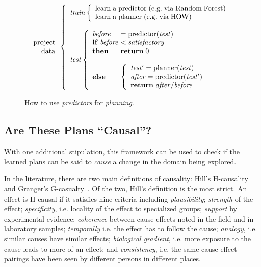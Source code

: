 \documentclass[conference]{IEEEtran}
\begin{document}
\begin{figure}[!t]
\small 
\[
\begin{array}{r}
\mathrm{project}\\
\mathrm{data}
\end{array} 
\left\{\begin{array}{l}\mathit{train}
        \left\{\begin{array}{l}
                \mathrm{learn\;a\;}\mathrm{predictor\;}\mathrm{(e.g.\;via \;Random\;Forest)}\\
                \mathrm{learn\;a\;}\mathrm{planner\;}\mathrm{(e.g.\;via \; HOW)}
              \end{array}\right.
       \\
      ~\\
\mathit{test}  
    \left\{\begin{array}{l@{~}l}
           \mathit{before}& =\mathrm{predictor}(\mathit{test})\\
           \mathrm{\bf if\;}\mathit{before} & <  \mathit{satisfactory}\\
           \mathrm{\bf then}  & \mathrm{{\bf return}\; 0}\\~\\
           \mathrm{\bf else} &
           \left\{
            \begin{array}{l}
                \mathit{test'} = \mathrm{planner}(\mathit{test})\\
                \mathit{after} =\mathrm{predictor}(\mathit{test'})\\ 
                \mathrm{{\bf return}\;} \mathit{after} /  \mathit{before}
            \end{array}
          \right.
   \end{array}\right.
\end{array} \right. 
\]
 
\caption{How to use {\em predictors} for {\em planning}.}\label{fig:work}
\end{figure}

\subsection{Are These Plans ``Causal''?}
With one additional stipulation,   this framework can be used to check if the learned
plans can be said to {\em cause} a change in the domain being explored.

In the literature, there are two main definitions of causality: Hill's H-causality~\cite{Hill1965}
and Granger's G-casualty~\cite{granger80}. 
Of the two, Hill's definition is the most strict. An effect
is H-causal if it satisfies nine criteria including
{\em  plausibility};
{\em strength} of the effect;
{\em 
specificity}, i.e. locality of the effect
to specialized groups;
{\em
support} by experimental evidence;
{\em 
coherence} between cause-effects noted
in the field and in laboratory samples;
{\em
temporally} i.e. the effect has to follow the cause;
{\em 
analogy}, i.e.  similar causes have similar effects;
{\em
biological gradient}, i.e.  more exposure to the cause leads to more of an
effect; and
{\em
consistency}, i.e.  the same cause-effect pairings have been seen by different persons
in different places.
\end{document}
